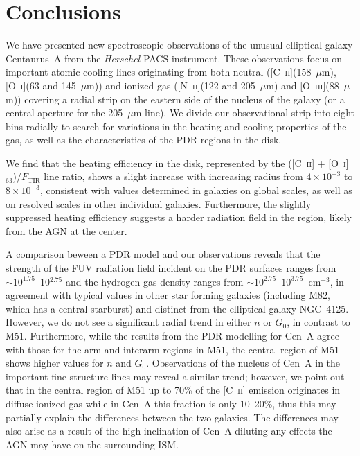 \section{Conclusions}\label{conclusions4}
We have presented new spectroscopic observations of the unusual elliptical galaxy Centaurus~A from the \emph{Herschel} PACS instrument.  These observations focus on important atomic cooling lines originating from both neutral ([C~\textsc{ii}](158~$\mu$m), [O~\textsc{i}](63 and 145~$\mu$m)) and ionized gas ([N~\textsc{ii}](122 and 205~$\mu$m) and [O~\textsc{iii}](88~$\mu$m)) covering a radial strip on the eastern side of the nucleus of the galaxy (or a central aperture for the 205~$\mu$m line).  We divide our observational strip into eight bins radially to search for variations in the heating and cooling properties of the gas, as well as the characteristics of the PDR regions in the disk.

We find that the heating efficiency in the disk, represented by the ([C~\textsc{ii}] + [O~\textsc{i}]$_{63}$)/$F_{\mathrm{TIR}}$ line ratio, shows a slight increase with increasing radius from $4 \times 10^{-3}$ to $8 \times 10^{-3}$, consistent with values determined in galaxies on global scales, as well as on resolved scales in other individual galaxies.  Furthermore, the slightly suppressed heating efficiency suggests a harder radiation field in the region, likely from the AGN at the center.

A comparison beween a PDR model and our observations reveals that the strength of the FUV radiation field incident on the PDR surfaces ranges from $\sim 10^{1.75}$--10$^{2.75}$ and the hydrogen gas density ranges from $\sim 10^{2.75}$--$10^{3.75}$~cm$^{-3}$, in agreement with typical values in other star forming galaxies (including M82, which has a central starburst) and distinct from the elliptical galaxy NGC~4125.  However, we do not see a significant radial trend in either $n$ or $G_{0}$, in contrast to M51.  Furthermore, while the results from the PDR modelling for Cen~A agree with those for the arm and interarm regions in M51, the central region of M51 shows higher values for $n$ and $G_{0}$.  Observations of the nucleus of Cen~A in the important fine structure lines may reveal a similar trend; however, we point out that in the central region of M51 up to 70\% of the [C~\textsc{ii}] emission originates in diffuse ionized gas while in Cen~A this fraction is only 10--20\%, thus this may partially explain the differences between the two galaxies.  The differences may also arise as a result of the high inclination of Cen~A diluting any effects the AGN may have on the surrounding ISM.

